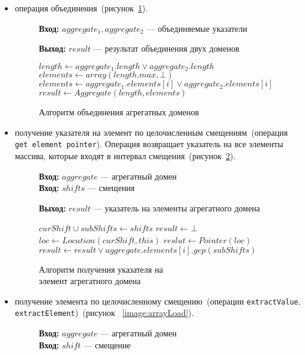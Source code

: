 \begin{itemize}
\item операция объединения~(рисунок~\ref{image:arrayJoin}).
\begin{figure}[h!]
\textbf{Вход:} $aggregate_1, aggregate_2$ --- объединяемые указатели

\textbf{Выход:} $result$ --- результат объединения двух доменов

\begin{algorithmic}[1]
\State $length \gets aggregate_1.length \vee aggregate_2.length$
\State $elements \gets array(length.max, \bot)$
    \State $elements \gets aggregate_1.elements[i] \vee
    aggregate_2.elements[i]$
\EndFor
\State $result \gets Aggregate(length, elements)$
\end{algorithmic}
\caption{Алгоритм объединения агрегатных доменов}
\label{image:arrayJoin}
\end{figure}

\item получение указателя на элемент по целочисленным смещениям~(операция 
\texttt{get element pointer}). Операция возвращает указатель на все элементы 
массива, которые входят в интервал смещения~(рисунок~\ref{image:arrayGep}).
\begin{figure}[h!]
\textbf{Вход:} $aggregate$ --- агрегатный домен\\
\textbf{Вход:} $shifts$ --- смещения

\textbf{Выход:} $result$ --- указатель на элементы агрегатного домена

\begin{algorithmic}[1]
\State $curShift \cup subShifts \gets shifts$
\State $result \gets \bot$
    \State $loc \gets Location({curShift}, this)$
    \State $reslut \gets Pointer({loc})$
\Else
        \State $result \gets result \vee aggregate.elements[i].gep(subShifts)$
    \EndFor
\EndIf
\end{algorithmic}
\caption{Алгоритм получения указателя на\\элемент агрегатного домена}
\label{image:arrayGep}
\end{figure}

\item получение элемента по целочисленному смещению~(операции 
\texttt{extractValue}, \texttt{extractElement})~(рисунок~
\ref{image:arrayLoad}).
\begin{figure}[h!]
\textbf{Вход:} $aggregate$ --- агрегатный домен\\
\textbf{Вход:} $shift$ --- смещение


\end{figure}
\end{itemize}

